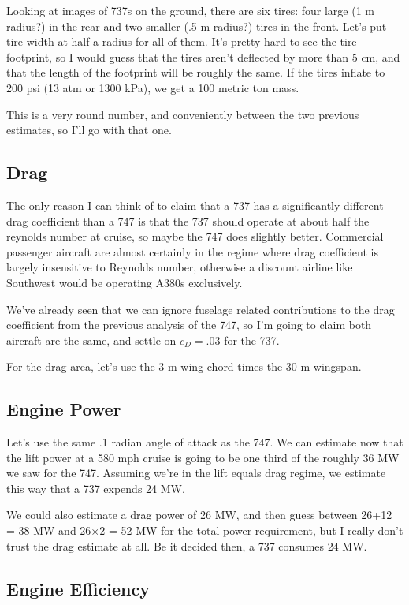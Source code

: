 \documentclass[12pt]{article}
\begin{document}
Looking at images of 737s on the ground, there are six tires: four large (1 m radius?) in the rear and two smaller (.5 m radius?) tires in the front. Let's put tire width at half a radius for all of them. It's pretty hard to see the tire footprint, so I would guess that the tires aren't deflected by more than 5 cm, and that the length of the footprint will be roughly the same. If the tires inflate to 200 psi (13 atm or 1300 kPa), we get a 100 metric ton mass.

This is a very round number, and conveniently between the two previous estimates, so I'll go with that one.

\subsection{Drag}

The only reason I can think of to claim that a 737 has a significantly different drag coefficient than a 747 is that the 737 should operate at about half the reynolds number at cruise, so maybe the 747 does slightly better. Commercial passenger aircraft are almost certainly in the regime where drag coefficient is largely insensitive to Reynolds number, otherwise a discount airline like Southwest would be operating A380s exclusively.

We've already seen that we can ignore fuselage related contributions to the drag coefficient from the previous analysis of the 747, so I'm going to claim both aircraft are the same, and settle on \(c_D = .03\) for the 737.

For the drag area, let's use the 3 m wing chord times the 30 m wingspan.

\subsection{Engine Power}

Let's use the same .1 radian angle of attack as the 747. We can estimate now that the lift power at a 580 mph cruise is going to be one third of the roughly 36 MW we saw for the 747. Assuming we're in the lift equals drag regime, we estimate this way that a 737 expends 24 MW.

We could also estimate a drag power of 26 MW, and then guess between 26+12 = 38 MW and 26\(\times\)2 = 52 MW
for the total power requirement, but I really don't trust the drag estimate at all. Be it decided then, a 737 consumes 24 MW.

\subsection{Engine Efficiency}
\end{document}
